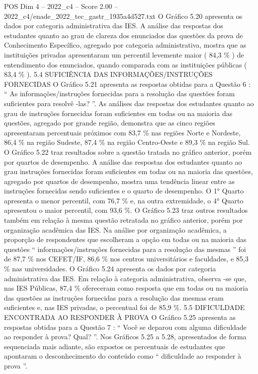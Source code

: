 \begin{textsample}{POS Dim 4 – 2022\_c4 – Score 2.00 – 2022\_c4/enade\_2022\_tec\_gastr\_1935a4d527.txt}
O Gráfico 5.20 apresenta os dados por categoria administrativa das IES.
A análise das respostas dos estudantes quanto ao grau de clareza dos enunciados das questões da prova de Conhecimento Específico, agregado por categoria administrativa, mostra que as instituições privadas apresentaram um percentil levemente maior ( 84,3 \% ) de entendimento dos enunciados, quando comparada com as instituições públicas ( 83,4 \% ). 5.4 SUFICIÊNCIA DAS INFORMAÇÕES/INSTRUÇÕES FORNECIDAS O Gráfico 5.21 apresenta as respostas obtidas para a Questão 6 : “ As informações/instruções fornecidas para a resolução das questões foram suficientes para resolvê -las? ”.
As análises das respostas dos estudantes quanto ao grau de instruções fornecidas foram suficientes em todas ou na maioria das questões, agregado por grande região, demonstra que as cinco regiões apresentaram percentuais próximos com 83,7 \% nas regiões Norte e Nordeste, 86,4 \% na região Sudeste, 87,4 \% na região Centro-Oeste e 89,3 \% na região Sul.
O Gráfico 5.22 traz resultados sobre a questão tratada no gráfico anterior, porém por quartos de desempenho.
A análise das respostas dos estudantes quanto ao grau instruções fornecidas foram suficientes em todas ou na maioria das questões, agregado por quartos de desempenho, mostra uma tendência linear entre as instruções fornecidas sendo suficientes e o quarto de desempenho.
O 1{\EmojiFont °} Quarto apresenta o menor percentil, com 76,7 \% e, na outra extremidade, o 4{\EmojiFont °} Quarto apresentou o maior percentil, com 93,6 \%.
O Gráfico 5.23 traz outros resultados também em relação à mesma questão retratada no gráfico anterior, porém por organização acadêmica das IES.
Na análise por organização acadêmica, a proporção de respondentes que escolheram a opção em todas ou na maioria das questões “ informações/instruções fornecidas para a resolução das mesmas ” foi de 87,7 \% nos CEFET/IF, 86,6 \% nos centros universitários e faculdades, e 85,3 \% nas universidades.
O Gráfico 5.24 apresenta os dados por categoria administrativa das IES.
Em relação à categoria administrativa, observa -se que, nas IES Públicas, 87,4 \% ofereceram como resposta que em todas ou na maioria das questões as instruções fornecidas para a resolução das mesmas eram suficientes e, nas IES privadas, o percentual foi de 85,9 \%. 5.5 DIFICULDADE ENCONTRADA AO RESPONDER À PROVA O Gráfico 5.25 apresenta as respostas obtidas para a Questão 7 : “ Você se deparou com alguma dificuldade ao responder à prova?
Qual? ”.
Nos Gráficos 5.25 a 5.28, apresentados de forma sequenciada mais adiante, são expostos os percentuais de estudantes que apontaram o desconhecimento do conteúdo como “ dificuldade ao responder à prova ”.

\end{textsample}
